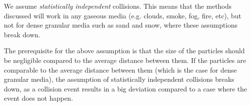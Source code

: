 We assume \textit{statistically independent} collisions. This means that the 
methods discussed will work in any gaseous media (e.g. clouds, smoke, fog, 
fire, etc), but not for dense granular media such as sand and snow, where these assumptions break down.

The prerequisite for the above assumption is that the size of the particles should
be negligible compared to the average distance between them. If the particles are 
comparable to the average distance between them (which is the case for dense 
granular media), the assumption of statistically independent collisions breaks 
down, as a collision event results in a big deviation compared to a case where the
event does not happen.